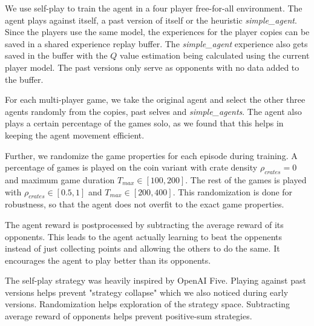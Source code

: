 
We use self-play to train the agent in a four player free-for-all environment. The agent plays against itself, a past version of itself or the heuristic \emph{simple\_agent}. Since the players use the same model, the experiences for the player copies can be saved in a shared experience replay buffer. The \emph{simple\_agent} experience also gets saved in the buffer with the $Q$ value estimation being calculated using the current player model. The past versions only serve as opponents with no data added to the buffer.

For each multi-player game, we take the original agent and select the other three agents randomly from the copies, past selves and \emph{simple\_agents}. The agent also plays a certain percentage of the games solo, as we found that this helps in keeping the agent movement efficient.

Further, we randomize the game properties for each episode during training. A percentage of games is played on the coin variant with crate density $\rho_{crates}=0$ and maximum game duration $T_{max}\in\left[100,200\right]$. The rest of the games is played with $\rho_{crates}\in\left[0.5, 1\right]$ and $T_{max}\in\left[200,400\right]$. This randomization is done for robustness, so that the agent does not overfit to the exact game properties.

The agent reward is postprocessed by subtracting the average reward of its opponents. This leads to the agent actually learning to beat the oppenents instead of just collecting points and allowing the others to do the same. It encourages the agent to play better than its opponents.

The self-play strategy was heavily inspired by OpenAI Five\cite{OpenAI_dota}. Playing against past versions helps prevent "strategy collapse" which we also noticed during early versions. Randomization helps exploration of the strategy space. Subtracting average reward of opponents helps prevent positive-sum strategies.
